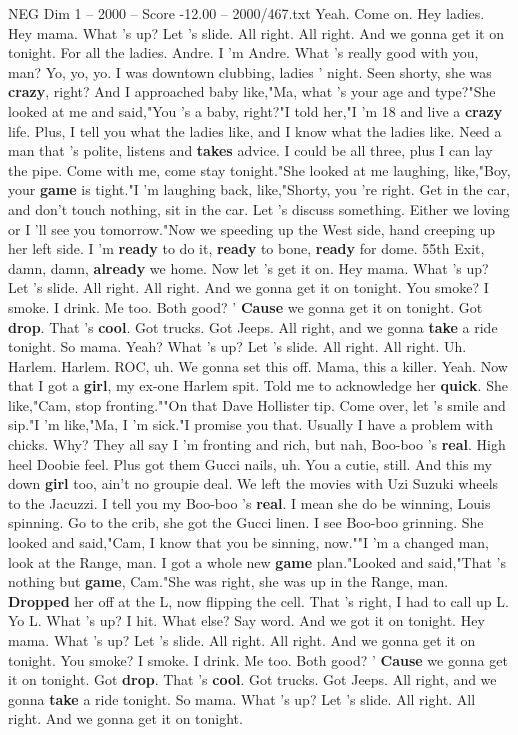 \begin{textsample}{NEG Dim 1 – 2000 – Score -12.00 – 2000/467.txt}  \label{ex:f1_neg_002}
Yeah.
Come on.
Hey ladies.
Hey mama.
What 's up?
Let 's slide.
All right.
All right.
And we gonna get it on tonight.
For all the ladies.
Andre.
I 'm Andre.
What 's really good with you, man?
Yo, yo, yo.
I was downtown clubbing, ladies ' night.
Seen shorty, she was \textbf{crazy}, right?
And I approached baby like,"Ma, what 's your age and type?"She looked at me and said,"You 's a baby, right?"I told her,"I 'm 18 and live a \textbf{crazy} life.
Plus, I tell you what the ladies like, and I know what the ladies like.
Need a man that 's polite, listens and \textbf{takes} advice.
I could be all three, plus I can lay the pipe.
Come with me, come stay tonight."She looked at me laughing, like,"Boy, your \textbf{game} is tight."I 'm laughing back, like,"Shorty, you 're right.
Get in the car, and don't touch nothing, sit in the car.
Let 's discuss something.
Either we loving or I 'll see you tomorrow."Now we speeding up the West side, hand creeping up her left side.
I 'm \textbf{ready} to do it, \textbf{ready} to bone, \textbf{ready} for dome. 55th Exit, damn, damn, \textbf{already} we home.
Now let 's get it on.
Hey mama.
What 's up?
Let 's slide.
All right.
All right.
And we gonna get it on tonight.
You smoke?
I smoke.
I drink.
Me too.
Both good? ' \textbf{Cause} we gonna get it on tonight.
Got \textbf{drop}.
That 's \textbf{cool}.
Got trucks.
Got Jeeps.
All right, and we gonna \textbf{take} a ride tonight.
So mama.
Yeah?
What 's up?
Let 's slide.
All right.
All right.
Uh.
Harlem.
Harlem.
ROC, uh.
We gonna set this off.
Mama, this a killer.
Yeah.
Now that I got a \textbf{girl}, my ex-one Harlem spit.
Told me to acknowledge her \textbf{quick}.
She like,"Cam, stop fronting.""On that Dave Hollister tip.
Come over, let 's smile and sip."I 'm like,"Ma, I 'm sick."I promise you that.
Usually I have a problem with chicks.
Why?
They all say I 'm fronting and rich, but nah, Boo-boo 's \textbf{real}.
High heel Doobie feel.
Plus got them Gucci nails, uh.
You a cutie, still.
And this my down \textbf{girl} too, ain't no groupie deal.
We left the movies with Uzi Suzuki wheels to the Jacuzzi.
I tell you my Boo-boo 's \textbf{real}.
I mean she do be winning, Louis spinning.
Go to the crib, she got the Gucci linen.
I see Boo-boo grinning.
She looked and said,"Cam, I know that you be sinning, now.""I 'm a changed man, look at the Range, man.
I got a whole new \textbf{game} plan."Looked and said,"That 's nothing but \textbf{game}, Cam."She was right, she was up in the Range, man. \textbf{Dropped} her off at the L, now flipping the cell.
That 's right, I had to call up L.
Yo L.
What 's up?
I hit.
What else?
Say word.
And we got it on tonight.
Hey mama.
What 's up?
Let 's slide.
All right.
All right.
And we gonna get it on tonight.
You smoke?
I smoke.
I drink.
Me too.
Both good? ' \textbf{Cause} we gonna get it on tonight.
Got \textbf{drop}.
That 's \textbf{cool}.
Got trucks.
Got Jeeps.
All right, and we gonna \textbf{take} a ride tonight.
So mama.
What 's up?
Let 's slide.
All right.
All right.
And we gonna get it on tonight.

\end{textsample}
